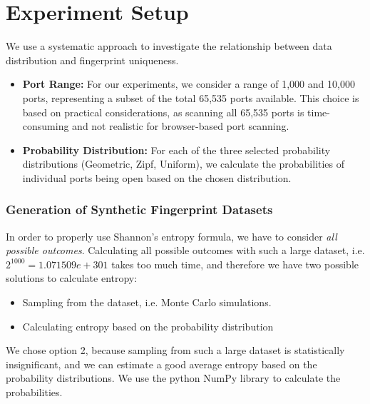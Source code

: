 \section{Experiment Setup}

We use a systematic approach to investigate the relationship between data distribution and fingerprint uniqueness. 

\begin{itemize}
\item \textbf{Port Range:} For our experiments, we consider a range of 1,000 and 10,000 ports, representing a subset of the total 65,535 ports available. This choice is based on practical considerations, as scanning all 65,535 ports is time-consuming and not realistic for browser-based port scanning.

\item \textbf{Probability Distribution:} For each of the three selected probability distributions (Geometric, Zipf, Uniform), we calculate the probabilities of individual ports being open based on the chosen distribution. 
\end{itemize}

\subsubsection{Generation of Synthetic Fingerprint Datasets}

In order to properly use Shannon's entropy formula, we have to consider \emph{all possible outcomes}. Calculating all possible outcomes with such a large dataset, i.e. $2^{1000} = 1.071509e+301$ takes too much time, and therefore we have two possible solutions to calculate entropy:

\begin{itemize}
    \item Sampling from the dataset, i.e. Monte Carlo simulations.
    \item Calculating entropy based on the probability distribution
\end{itemize}

We chose option 2, because sampling from such a large dataset is statistically insignificant, and we can estimate a good average entropy based on the probability distributions.
We use the python NumPy library to calculate the probabilities.


